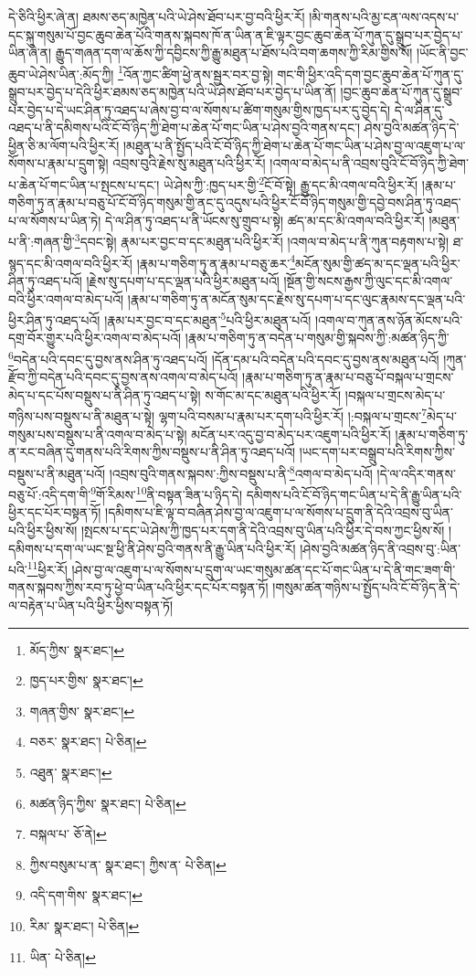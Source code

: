 དེ་ཅིའི་ཕྱིར་ཞེ་ན། ཐམས་ཅད་མཁྱེན་པའི་ཡེ་ཤེས་ཐོབ་པར་བྱ་བའི་ཕྱིར་རོ། །མི་གནས་པའི་མྱ་ངན་ལས་འདས་པ་དང་སྐུ་གསུམ་པོ་བྱང་ཆུབ་ཆེན་པོའི་གནས་སྐབས་ཁོ་ན་ཡིན་ན་ཇི་ལྟར་བྱང་ཆུབ་ཆེན་པོ་ཀུན་དུ་སྒྲུབ་པར་བྱེད་པ་ཡིན་ཞེ་ན། རྒྱུད་གཞན་དག་ལ་ཆོས་ཀྱི་དབྱིངས་ཀྱི་རྒྱུ་མཐུན་པ་ཐོས་པའི་བག་ཆགས་ཀྱི་རིམ་གྱིས་སོ། །ཡོང་ནི་བྱང་ཆུབ་ཡེ་ཤེས་ཡིན་:མོད་ཀྱི། \footnote{མོད་ཀྱིས་  སྣར་ཐང་། }འོན་ཀྱང་ཚིག་ཕྱེ་ནས་སྦྱར་བར་བྱ་སྟེ། གང་གི་ཕྱིར་འདི་དག་བྱང་ཆུབ་ཆེན་པོ་ཀུན་དུ་སྒྲུབ་པར་བྱེད་པ་དེའི་ཕྱིར་ཐམས་ཅད་མཁྱེན་པའི་ཡེ་ཤེས་ཐོབ་པར་བྱེད་པ་ཡིན་ནོ། །བྱང་ཆུབ་ཆེན་པོ་ཀུན་དུ་སྒྲུབ་པར་བྱེད་པ་དེ་ཡང་ཤིན་ཏུ་འཐད་པ་ཞེས་བྱ་བ་ལ་སོགས་པ་ཚིག་གསུམ་གྱིས་ཁྱད་པར་དུ་བྱེད་དེ། དེ་ལ་ཤིན་དུ་འཐད་པ་ནི་དམིགས་པའི་ངོ་བོ་ཉིད་ཀྱི་ཐེག་པ་ཆེན་པོ་གང་ཡིན་པ་ཤེས་བྱའི་གནས་དང་། ཤེས་བྱའི་མཚན་ཉིད་དེ་ཕྱིན་ཅི་མ་ལོག་པའི་ཕྱིར་རོ། །མཐུན་པ་ནི་སྤྱོད་པའི་ངོ་བོ་ཉིད་ཀྱི་ཐེག་པ་ཆེན་པོ་གང་ཡིན་པ་ཤེས་བྱ་ལ་འཇུག་པ་ལ་སོགས་པ་རྣམ་པ་དྲུག་སྟེ། འབྲས་བུའི་རྗེས་སུ་མཐུན་པའི་ཕྱིར་རོ། །འགལ་བ་མེད་པ་ནི་འབྲས་བུའི་ངོ་བོ་ཉིད་ཀྱི་ཐེག་པ་ཆེན་པོ་གང་ཡིན་པ་སྤངས་པ་དང་། ཡེ་ཤེས་ཀྱི་:ཁྱད་པར་གྱི་\footnote{ཁྱད་པར་གྱིས་  སྣར་ཐང་། }ངོ་བོ་སྟེ། རྒྱུ་དང་མི་འགལ་བའི་ཕྱིར་རོ། །རྣམ་པ་གཅིག་ཏུ་ན་རྣམ་པ་བཅུ་པོ་ངོ་བོ་ཉིད་གསུམ་གྱི་ནང་དུ་འདུས་པའི་ཕྱིར་ངོ་བོ་ཉིད་གསུམ་གྱི་དབྱེ་བས་ཤིན་ཏུ་འཐད་པ་ལ་སོགས་པ་ཡིན་ཏེ། དེ་ལ་ཤིན་ཏུ་འཐད་པ་ནི་ཡོངས་སུ་གྲུབ་པ་སྟེ། ཚད་མ་དང་མི་འགལ་བའི་ཕྱིར་རོ། །མཐུན་པ་ནི་:གཞན་གྱི་\footnote{གཞན་གྱིས་  སྣར་ཐང་། }དབང་སྟེ། རྣམ་པར་བྱང་བ་དང་མཐུན་པའི་ཕྱིར་རོ། །འགལ་བ་མེད་པ་ནི་ཀུན་བརྟགས་པ་སྟེ། ཐ་སྙད་དང་མི་འགལ་བའི་ཕྱིར་རོ། །རྣམ་པ་གཅིག་ཏུ་ན་རྣམ་པ་བཅུ་ཆར་\footnote{བཅར་  སྣར་ཐང་།  པེ་ཅིན། }མངོན་སུམ་གྱི་ཚད་མ་དང་ལྡན་པའི་ཕྱིར་ཤིན་ཏུ་འཐད་པའོ། །རྗེས་སུ་དཔག་པ་དང་ལྡན་པའི་ཕྱིར་མཐུན་པའོ། །སྔོན་གྱི་སངས་རྒྱས་ཀྱི་ལུང་དང་མི་འགལ་བའི་ཕྱིར་འགལ་བ་མེད་པའོ། །རྣམ་པ་གཅིག་ཏུ་ན་མངོན་སུམ་དང་རྗེས་སུ་དཔག་པ་དང་ལུང་རྣམས་དང་ལྡན་པའི་ཕྱིར་ཤིན་ཏུ་འཐད་པའོ། །རྣམ་པར་བྱང་བ་དང་མཐུན་\footnote{འཐུན་  སྣར་ཐང་། }པའི་ཕྱིར་མཐུན་པའོ། །འགལ་བ་ཀུན་ནས་ཉོན་མོངས་པའི་དགྲ་བོར་གྱུར་པའི་ཕྱིར་འགལ་བ་མེད་པའོ། །རྣམ་པ་གཅིག་ཏུ་ན་བདེན་པ་གསུམ་གྱི་སྐབས་ཀྱི་:མཚན་ཉིད་ཀྱི་\footnote{མཚན་ཉིད་ཀྱིས་  སྣར་ཐང་།  པེ་ཅིན། }བདེན་པའི་དབང་དུ་བྱས་ནས་ཤིན་ཏུ་འཐད་པའོ། །དོན་དམ་པའི་བདེན་པའི་དབང་དུ་བྱས་ནས་མཐུན་པའོ། །ཀུན་རྫོབ་ཀྱི་བདེན་པའི་དབང་དུ་བྱས་ནས་འགལ་བ་མེད་པའོ། །རྣམ་པ་གཅིག་ཏུ་ན་རྣམ་པ་བཅུ་པོ་བསྐལ་པ་གྲངས་མེད་པ་དང་པོས་བསྡུས་པ་ནི་ཤིན་ཏུ་འཐད་པ་སྟེ། ས་གོང་མ་དང་མཐུན་པའི་ཕྱིར་རོ། །བསྐལ་པ་གྲངས་མེད་པ་གཉིས་པས་བསྡུས་པ་ནི་མཐུན་པ་སྟེ། ལྷག་པའི་བསམ་པ་རྣམ་པར་དག་པའི་ཕྱིར་རོ། །:བསྐལ་པ་གྲངས་\footnote{བསྐལ་པ་  ཅོ་ནེ། }མེད་པ་གསུམ་པས་བསྡུས་པ་ནི་འགལ་བ་མེད་པ་སྟེ། མངོན་པར་འདུ་བྱ་བ་མེད་པར་འཇུག་པའི་ཕྱིར་རོ། །རྣམ་པ་གཅིག་ཏུ་ན་རང་བཞིན་དུ་གནས་པའི་རིགས་ཀྱིས་བསྡུས་པ་ནི་ཤིན་ཏུ་འཐད་པའོ། །ཡང་དག་པར་བསྒྲུབ་པའི་རིགས་ཀྱིས་བསྡུས་པ་ནི་མཐུན་པའོ། །འབྲས་བུའི་གནས་སྐབས་:ཀྱིས་བསྡུས་པ་ནི་\footnote{ཀྱིས་བསུམ་པ་ན་  སྣར་ཐང་། ཀྱིས་ན་  པེ་ཅིན། }འགལ་བ་མེད་པའོ། །དེ་ལ་འདིར་གནས་བཅུ་པོ་:འདི་དག་གི་\footnote{འདི་དག་གིས་  སྣར་ཐང་། }གོ་རིམས་\footnote{རིམ་  སྣར་ཐང་།  པེ་ཅིན། }ནི་བསྟན་ཟིན་པ་ཉིད་དེ། དམིགས་པའི་ངོ་བོ་ཉིད་གང་ཡིན་པ་དེ་ནི་རྒྱུ་ཡིན་པའི་ཕྱིར་དང་པོར་བསྟན་ཏོ། །དམིགས་པ་ཇི་ལྟ་བ་བཞིན་ཤེས་བྱ་ལ་འཇུག་པ་ལ་སོགས་པ་དྲུག་ནི་དེའི་འབྲས་བུ་ཡིན་པའི་ཕྱིར་ཕྱིས་སོ། །སྤངས་པ་དང་ཡེ་ཤེས་ཀྱི་ཁྱད་པར་དག་ནི་དེའི་འབྲས་བུ་ཡིན་པའི་ཕྱིར་དེ་བས་ཀྱང་ཕྱིས་སོ། །དམིགས་པ་དག་ལ་ཡང་སྔ་ཕྱི་ནི་ཤེས་བྱའི་གནས་ནི་རྒྱུ་ཡིན་པའི་ཕྱིར་རོ། །ཤེས་བྱའི་མཚན་ཉིད་ནི་འབྲས་བུ་:ཡིན་པའི་\footnote{ཡིན་  པེ་ཅིན། }ཕྱིར་རོ། །ཤེས་བྱ་ལ་འཇུག་པ་ལ་སོགས་པ་དྲུག་ལ་ཡང་གསུམ་ཚན་དང་པོ་གང་ཡིན་པ་དེ་ནི་གང་ཟག་གི་གནས་སྐབས་ཀྱིས་རབ་ཏུ་ཕྱེ་བ་ཡིན་པའི་ཕྱིར་དང་པོར་བསྟན་ཏོ། །གསུམ་ཚན་གཉིས་པ་སྤྱོད་པའི་ངོ་བོ་ཉིད་ནི་དེ་ལ་བརྟེན་པ་ཡིན་པའི་ཕྱིར་ཕྱིས་བསྟན་ཏོ། 